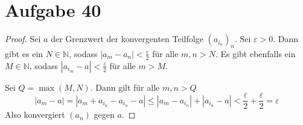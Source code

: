 \documentclass[10pt,a4paper]{article}
\begin{document}
\section{Aufgabe 40}
\begin{proof}
  Sei $a$ der Grenzwert der konvergenten Teilfolge $(a_{i_{n}})_{n}$.
  Sei $\varepsilon > 0$.
  Dann gibt es ein $N \in \mathbb{N}$, sodass $|a_{m} - a_{n}| < \frac{\varepsilon}{2}$ für alle $m, n > N$.
  Es gibt ebenfalls ein $M \in \mathbb{N}$, sodass $|a_{i_{m}} - a| < \frac{\varepsilon}{2}$ für alle $m > M$.

  Sei $Q = \max(M, N)$.
  Dann gilt für alle $m, n > Q$
  \begin{equation}
    |a_{m} - a| = |a_{m} + a_{i_{n}} - a_{i_{n}} - a| \le |a_{m} - a_{i_{n}}| + |a_{i_{n}} - a| < \frac{\varepsilon}{2} + \frac{\varepsilon}{2} = \varepsilon
  \end{equation}
  Also konvergiert $(a_n)$ gegen $a$.
\end{proof}
\end{document}
